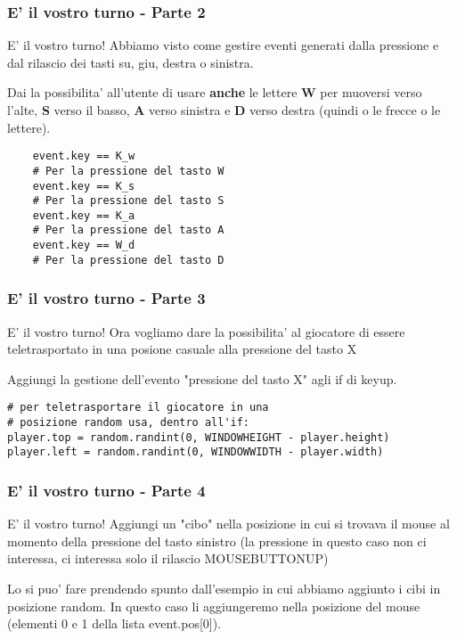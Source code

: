 \begin{frame}[fragile]
\frametitle{E' il vostro turno - Parte 2}
\begin{block}{E' il vostro turno!}
    Abbiamo visto come gestire eventi generati dalla pressione e dal rilascio dei tasti su, giu, destra o sinistra.
    
    Dai la possibilita' all'utente di usare \textbf{anche} le lettere \textbf{W} per muoversi verso l'alte, \textbf{S} verso il basso, \textbf{A} verso sinistra e \textbf{D} verso destra (quindi o le frecce o le lettere).
    
    \begin{lstlisting}
    event.key == K_w
    # Per la pressione del tasto W
    event.key == K_s
    # Per la pressione del tasto S
    event.key == K_a
    # Per la pressione del tasto A
    event.key == W_d
    # Per la pressione del tasto D
    \end{lstlisting}
\end{block}

\end{frame}

\begin{frame}[fragile]
\frametitle{E' il vostro turno - Parte 3}
\begin{block}{E' il vostro turno!}
    Ora vogliamo dare la possibilita' al giocatore di essere teletrasportato in una posione casuale alla pressione del tasto X
    
    Aggiungi la gestione dell'evento "pressione del tasto X" agli if di keyup.
    
    \begin{lstlisting}
# per teletrasportare il giocatore in una
# posizione random usa, dentro all'if:
player.top = random.randint(0, WINDOWHEIGHT - player.height)
player.left = random.randint(0, WINDOWWIDTH - player.width)
    \end{lstlisting}
\end{block}

\end{frame}

\begin{frame}[fragile]
\frametitle{E' il vostro turno - Parte 4}
\begin{block}{E' il vostro turno!}
    Aggiungi un "cibo" nella posizione in cui si trovava il mouse al momento della pressione del tasto sinistro (la pressione in questo caso non ci interessa, ci interessa solo il rilascio MOUSEBUTTONUP)
        
    Lo si puo' fare prendendo spunto dall'esempio in cui abbiamo aggiunto i cibi in posizione random. In questo caso li aggiungeremo nella posizione del mouse (elementi 0 e 1 della lista event.pos[0]).
\end{block}

\end{frame}

